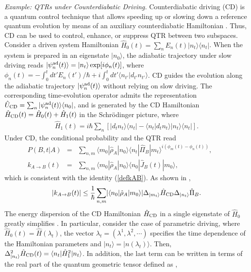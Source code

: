 \documentclass[prl,aps,amssymb,twocolumn,superscriptaddress, notitlepage, longbibliography]{revtex4-2}
\begin{document}
{\it Example: QTRs under Counterdiabatic Driving.}
Counterdiabatic driving (CD) is a quantum control technique that allows speeding up or slowing down a reference quantum evolution by means of an auxiliary counterdiabatic Hamiltonian \cite{Demirplak2003Adiabatic,Demirplak2005Assisted,Demirplak2008Consistency,Berry2009Transitionless}.
Thus, CD can be used to control, enhance, or suppress QTR between two subspaces. Consider a driven system Hamiltonian $\hat{H}_0(t)=\sum_nE_n(t)|n_t\rangle\langle n_t|$. When the system is prepared in an eigenstate $|n_0\rangle$, the adiabatic trajectory under slow driving reads $|\psi_n^{\rm ad}(t)\rangle =|n_t\rangle\exp[i\phi_n(t)]$, where $\phi_n(t)=-\int_0^tdt'E_n(t')/\hbar+i\int_0^tdt'\langle n_{t'}|d_{t'}n_{t'}\rangle$. CD guides the evolution along the adiabatic trajectory $|\psi_n^{\rm ad}(t)\rangle$ without relying on slow driving. The corresponding time-evolution operator admits the representation $\hat{U}_{\rm CD}=\sum_n|\psi_n^{\rm ad}(t)\rangle\langle n_0|$, and is generated by the CD Hamiltonian $\hat{H}_{\rm CD}(t)=\hat{H}_0(t)+\hat{H}_1(t)$ in the Schr\"odinger picture, where
\begin{eqnarray}
\hat{H}_{1}(t)=i\hbar\sum_n\left[|d_tn_t\rangle\langle n_t|-\langle n_t|d_tn_t\rangle|n_t\rangle\langle n_t|\right].\nonumber
\end{eqnarray}
Under CD, the conditional probability and the QTR read
\begin{eqnarray}
P(B,t|A)&\!=\!&\sum_{n,m}\langle m_0|\hat{\rho}_A|n_0\rangle\langle n_t|\hat{\Pi}_B|m_t\rangle^{i(\phi_m(t)-\phi_n(t))},\qquad\\
k_{A\rightarrow B}(t)&\!=\!&\sum_{n,m}\langle m_0|\hat{\rho}_A|n_0\rangle \langle n_0|\hat{J}_B(t)|m_0\rangle,\quad
\end{eqnarray}
which is consistent with the identity (\ref{defkAB}). As shown in \cite{SM},
\begin{equation}
|k_{A\rightarrow B}(t)|\leq \frac{1}{\hbar}\sum_{n,m}\lvert\langle n_0|\hat{\rho}_A|m_0\rangle\rvert  \Delta_{|m_t\rangle}\hat H_{\rm CD}\Delta_{|n_t\rangle} \hat\Pi_B.
\end{equation}
The energy dispersion of the CD Hamiltonian $\hat{H}_{\rm CD}$ in a single eigenstate of $\hat{H}_0$ greatly simplifies \cite{delcampo12,Funo17}. In particular, consider the case of parametric driving, where $\hat H_0(t)=\hat H(\lambda_t)$, the vector $\lambda_t=(\lambda^1,\lambda^2,\cdots)$ specifies the time dependence of the Hamiltonian parameters and $|n_t\rangle=|n(\lambda_t)\rangle$. Then,
$\Delta^2_{|n_t\rangle}\hat H_{\rm CD}(t)=\langle n_t|\hat{H}_1^2|n_t\rangle$. In addition, the last term can be written in terms of the real part of the quantum geometric tensor defined as \cite{Provost1980},
\end{document}
